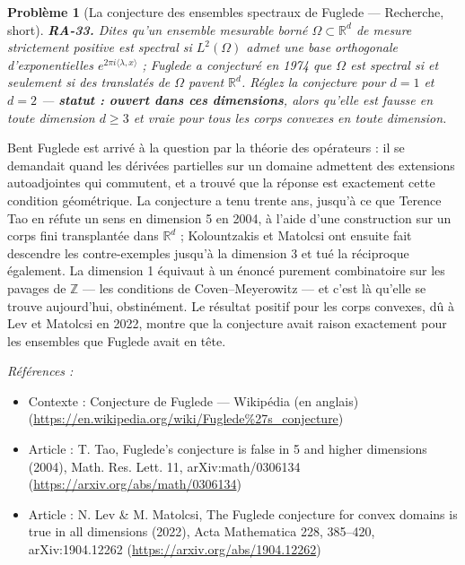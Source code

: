 \documentclass[11pt]{article}
\newtheorem{problem}{Problème}
\newenvironment{refs}{\par\small\noindent\emph{Références :}\begin{itemize}\setlength\itemsep{0pt}}{\end{itemize}\normalsize}
\begin{document}
\bigskip

\begin{problem}[{La conjecture des ensembles spectraux de Fuglede --- Recherche, short}]
\textbf{RA-33.} Dites qu'un ensemble mesurable borné
$ \Omega \subset \mathbb{R}^d $ de mesure strictement positive est \textit{spectral} si
$ L^2(\Omega) $ admet une base orthogonale d'exponentielles
$ e^{2\pi i \langle \lambda, x \rangle} $ ; Fuglede a conjecturé en 1974 que $ \Omega $ est
spectral si et seulement si des translatés de $ \Omega $ pavent $ \mathbb{R}^d $. Réglez la
conjecture pour $ d = 1 $ et $ d = 2 $ --- \textbf{statut : ouvert dans ces dimensions}, alors
qu'elle est fausse en toute dimension $ d \ge 3 $ et vraie pour tous les corps convexes en toute
dimension.
\end{problem}

\noindent Bent Fuglede est arrivé à la question par la théorie des opérateurs : il se
demandait quand les dérivées partielles sur un domaine admettent des extensions autoadjointes qui
commutent, et a trouvé que la réponse est exactement cette condition géométrique. La conjecture a
tenu trente ans, jusqu'à ce que Terence Tao en réfute un sens en dimension 5 en 2004, à l'aide d'une
construction sur un corps fini transplantée dans $ \mathbb{R}^d $ ; Kolountzakis et Matolcsi ont
ensuite fait descendre les contre-exemples jusqu'à la dimension 3 et tué la réciproque également. La
dimension 1 équivaut à un énoncé purement combinatoire sur les pavages de $ \mathbb{Z} $ --- les
conditions de Coven--Meyerowitz --- et c'est là qu'elle se trouve aujourd'hui, obstinément. Le résultat
positif pour les corps convexes, dû à Lev et Matolcsi en 2022, montre que la conjecture avait raison
exactement pour les ensembles que Fuglede avait en tête.

\begin{refs}
\item Contexte : Conjecture de Fuglede --- Wikipédia (en anglais) (\url{https://en.wikipedia.org/wiki/Fuglede%27s_conjecture})
\item Article : T. Tao, \og{} Fuglede's conjecture is false in 5 and higher dimensions \fg{} (2004), Math. Res. Lett. 11, arXiv:math/0306134 (\url{https://arxiv.org/abs/math/0306134})
\item Article : N. Lev \& M. Matolcsi, \og{} The Fuglede conjecture for convex domains is true in all dimensions \fg{} (2022), Acta Mathematica 228, 385--420, arXiv:1904.12262 (\url{https://arxiv.org/abs/1904.12262})
\end{refs}
\end{document}
